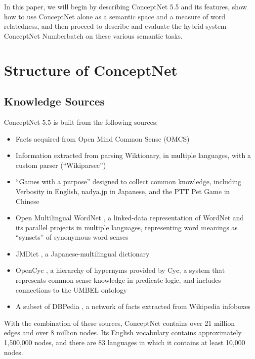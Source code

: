 \documentclass[letterpaper]{article}
\begin{document}
In this paper, we will begin by describing ConceptNet 5.5 and its features,
show how to use ConceptNet alone as a semantic space and a measure of word
relatedness, and then proceed to describe and evaluate the hybrid system
ConceptNet Numberbatch on these various semantic tasks.

\section{Structure of ConceptNet}\label{structure-of-conceptnet}

\subsection{Knowledge Sources}\label{knowledge-sources}

ConceptNet 5.5 is built from the following sources:

\begin{itemize}
\item
  Facts acquired from Open Mind Common Sense (OMCS) \cite{singh2002omcs}
\item
  Information extracted from parsing Wiktionary, in multiple languages,
  with a custom parser (``Wikiparsec'')
\item
  ``Games with a purpose'' designed to collect common knowledge,
  including Verbosity \cite{vonahn2006verbosity} in English, nadya.jp
  \cite{nakahara2011nadya} in Japanese, and the PTT Pet Game
  \cite{kuo2009petgame} in Chinese
\item
  Open Multilingual WordNet \cite{bond2013linking}, a linked-data
  representation of WordNet \cite{miller1998wordnet} and its parallel
  projects in multiple languages, representing word meanings as
  ``synsets'' of synonymous word senses
\item
  JMDict \cite{breen2004jmdict}, a Japanese-multilingual dictionary
\item
  OpenCyc \cite{matuszek2006cyc}, a hierarchy of hypernyms provided by
  Cyc, a system that represents common sense knowledge in predicate
  logic, and includes connections to the UMBEL ontology
  \cite{bergman2008umbel}
\item
  A subset of DBPedia \cite{auer2007dbpedia}, a network of facts
  extracted from Wikipedia infoboxes
\end{itemize}

With the combination of these sources, ConceptNet contains over 21
million edges and over 8 million nodes. Its English vocabulary contains
approximately 1,500,000 nodes, and there are 83 languages in which it
contains at least 10,000 nodes.
\end{document}
